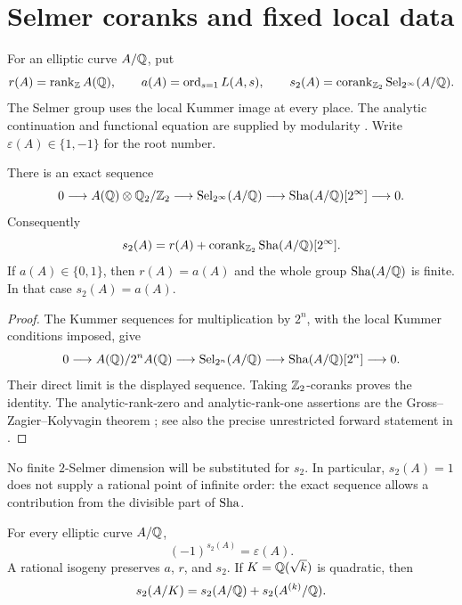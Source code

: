 \section{Selmer coranks and fixed local data}\label{sec:preliminaries}

For an elliptic curve $A/\mathbb Q$, put
\[
 r(A)=\operatorname{rank}_{\mathbb Z}A(\mathbb Q),\qquad
 a(A)=\operatorname{ord}_{s=1}L(A,s),\qquad
 s_2(A)=\operatorname{corank}_{\mathbb Z_2}\operatorname{Sel}_{2^\infty}(A/\mathbb Q).
\]
The Selmer group uses the local Kummer image at every place.
The analytic continuation and functional equation are supplied by modularity
\cite{BCDT2001}. Write $\varepsilon(A)\in\{1,-1\}$ for the root number.

\begin{lemma}\label{pr:ranks}
There is an exact sequence
\[
0\longrightarrow A(\mathbb Q)\otimes\mathbb Q_2/\mathbb Z_2
\longrightarrow \operatorname{Sel}_{2^\infty}(A/\mathbb Q)
\longrightarrow \operatorname{Sha}(A/\mathbb Q)[2^\infty]\longrightarrow0.
\]
Consequently
\[
s_2(A)=r(A)+\operatorname{corank}_{\mathbb Z_2}\operatorname{Sha}(A/\mathbb Q)[2^\infty].
\]
If $a(A)\in\{0,1\}$, then $r(A)=a(A)$ and the whole group
$\operatorname{Sha}(A/\mathbb Q)$ is finite. In that case $s_2(A)=a(A)$.
\end{lemma}

\begin{proof}
The Kummer sequences for multiplication by $2^n$, with the local
Kummer conditions imposed, give
\[
0\longrightarrow A(\mathbb Q)/2^n A(\mathbb Q)
\longrightarrow \operatorname{Sel}_{2^n}(A/\mathbb Q)
\longrightarrow \operatorname{Sha}(A/\mathbb Q)[2^n]\longrightarrow0.
\]
Their direct limit is the displayed sequence. Taking $\mathbb Z_2$-coranks proves
the identity. The analytic-rank-zero and analytic-rank-one assertions are
the Gross--Zagier--Kolyvagin theorem
\cite{GrossZagier1986,Kolyvagin1990}; see also the precise unrestricted
forward statement in \cite[\S1]{Skinner2020}.
\end{proof}

No finite $2$-Selmer dimension will be substituted for $s_2$.
In particular, $s_2(A)=1$ does not supply a rational point of infinite order:
the exact sequence allows a contribution from the divisible part of $\operatorname{Sha}$.

\begin{lemma}\label{pr:invariance}
For every elliptic curve $A/\mathbb Q$,
\[
(-1)^{s_2(A)}=\varepsilon(A).
\]
A rational isogeny preserves $a$, $r$, and $s_2$. If
$K=\mathbb Q(\sqrt{k})$ is quadratic, then
\[
s_2(A/K)=s_2(A/\mathbb Q)+s_2(A^{(k)}/\mathbb Q).
\]
\end{lemma}

